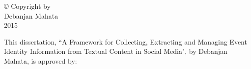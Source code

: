\documentclass[12pt, oneside]{Thesis} %
\begin{document}
\begin{titlepage}
\begin{center}
 
% 
 
 
\vfill
\end{center}

\end{titlepage}

\clearpage

\begin{center} \large \copyright \; Copyright by \\
Debanjan Mahata \\
2015
\end{center}
\clearpage

\normalsize This dissertation, ``A Framework for Collecting, Extracting and Managing Event Identity Information from Textual Content in Social Media", by Debanjan Mahata, is approved by: \\
\end{document}
